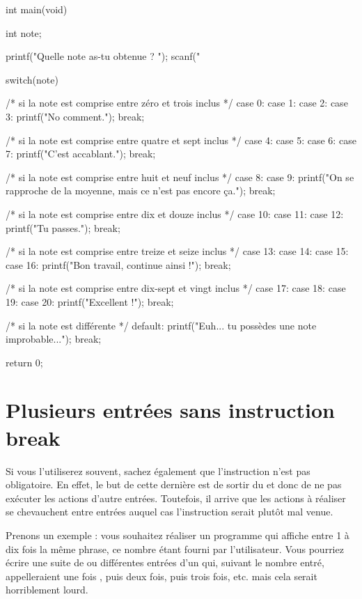 \begin{C}
int main(void)
{
    int note;

    printf("Quelle note as-tu obtenue ? ");
    scanf("%

    switch(note)
    {
    /* si la note est comprise entre zéro et trois inclus */
    case 0:
    case 1:
    case 2:
    case 3:
        printf("No comment.\n");
        break;

    /* si la note est comprise entre quatre et sept inclus */
    case 4:
    case 5:
    case 6:
    case 7:
        printf("C'est accablant.\n");
        break;

    /* si la note est comprise entre huit et neuf inclus */  
    case 8:
    case 9:
        printf("On se rapproche de la moyenne, mais ce n'est pas encore ça.\n");
        break;

    /* si la note est comprise entre dix et douze inclus */
    case 10:
    case 11:
    case 12:
        printf("Tu passes.\n");
        break;

    /* si la note est comprise entre treize et seize inclus */
    case 13:
    case 14:
    case 15:
    case 16:
        printf("Bon travail, continue ainsi !\n");
        break;

    /* si la note est comprise entre dix-sept et vingt inclus */
    case 17:
    case 18:
    case 19:
    case 20:
        printf("Excellent !\n");
        break;

    /* si la note est différente */
    default:
        printf("Euh... tu possèdes une note improbable...\n");
        break;
    }

    return 0;
}
\end{C}

\section{Plusieurs entrées sans instruction break}
\label{plusieurs-entrees-sans-instruction-break}

Si vous l'utiliserez souvent, sachez également que l'instruction
 n'est pas obligatoire. En effet, le but de cette dernière
est de sortir du  et donc de ne pas exécuter les actions
d'autre entrées. Toutefois, il arrive que les actions à réaliser se
chevauchent entre entrées auquel cas l'instruction  serait
plutôt mal venue.

Prenons un exemple : vous souhaitez réaliser un programme qui affiche
entre 1 à dix fois la même phrase, ce nombre étant fourni par
l'utilisateur. Vous pourriez écrire une suite de  ou
différentes entrées d'un  qui, suivant le nombre entré,
appelleraient une fois , puis deux fois, puis trois
fois, etc. mais cela serait horriblement lourd.

